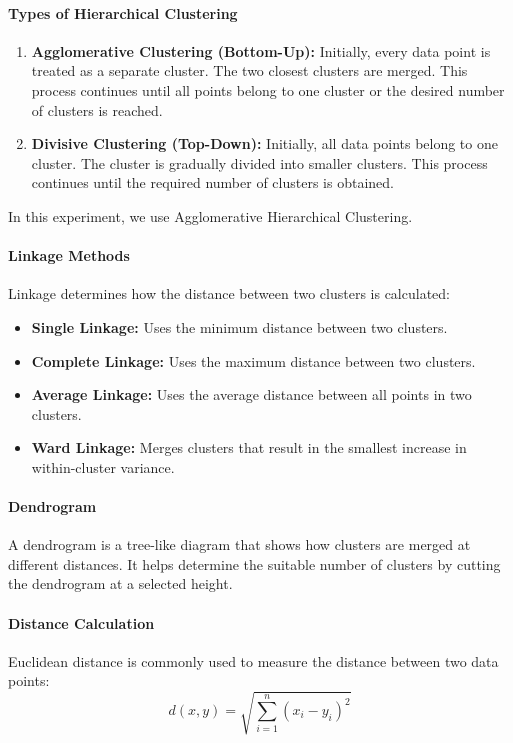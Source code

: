 \documentclass[a4paper,11pt]{article}
\begin{document}
\paragraph{Types of Hierarchical Clustering}
\begin{enumerate}
    \item \textbf{Agglomerative Clustering (Bottom-Up):} Initially, every data point is treated as a separate cluster. The two closest clusters are merged. This process continues until all points belong to one cluster or the desired number of clusters is reached.
    \item \textbf{Divisive Clustering (Top-Down):} Initially, all data points belong to one cluster. The cluster is gradually divided into smaller clusters. This process continues until the required number of clusters is obtained.
\end{enumerate}
In this experiment, we use Agglomerative Hierarchical Clustering.

\paragraph{Linkage Methods}
Linkage determines how the distance between two clusters is calculated:
\begin{itemize}
    \item \textbf{Single Linkage:} Uses the minimum distance between two clusters.
    \item \textbf{Complete Linkage:} Uses the maximum distance between two clusters.
    \item \textbf{Average Linkage:} Uses the average distance between all points in two clusters.
    \item \textbf{Ward Linkage:} Merges clusters that result in the smallest increase in within-cluster variance.
\end{itemize}

\paragraph{Dendrogram}
A dendrogram is a tree-like diagram that shows how clusters are merged at different distances. It helps determine the suitable number of clusters by cutting the dendrogram at a selected height.

\paragraph{Distance Calculation}
Euclidean distance is commonly used to measure the distance between two data points:
\[
d(x, y) = \sqrt{\sum_{i=1}^{n}(x_i - y_i)^2}
\]
\end{document}
